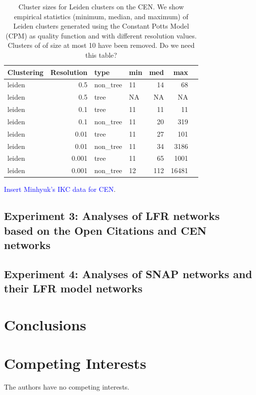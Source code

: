 \documentclass[11pt]{article}   	%
\begin{document}
\begin{table}[H]
\centering
\begin{tabular}{lrllrrr}
  \hline
 Clustering & Resolution & type & min & med & max \\
  \hline
leiden & 0.5 & non\_tree &  11 & 14 &  68 \\
leiden & 0.5 & tree &  NA & NA &  NA \\
leiden & 0.1 & tree &  11 & 11 &  11 \\
leiden  & 0.1 & non\_tree &  11 & 20 & 319 \\
leiden  & 0.01 & tree &  11 & 27 & 101 \\
leiden & 0.01 & non\_tree &  11 & 34 & 3186 \\
leiden & 0.001 & tree &  11 & 65 & 1001 \\
leiden & 0.001 & non\_tree &  12 & 112 & 16481 \\

   \hline
\end{tabular}
\caption{Cluster sizes for Leiden clusters on the CEN. We show empirical statistics (minimum, median, and maximum) of Leiden clusters generated using the Constant Potts Model (CPM) as quality function and with different resolution values. Clusters of of size at most 10 have been removed. Do we need this table?}
\end{table}



\textcolor{blue}{Insert Minhyuk's IKC data for CEN}.


\subsection{Experiment 3: Analyses of LFR networks based on the Open Citations and CEN networks}

\subsection{Experiment 4: Analyses of SNAP networks and their LFR model networks}



\section{Conclusions}

\section*{Competing Interests} \vspace{3mm} The authors have no competing interests.
\end{document}
